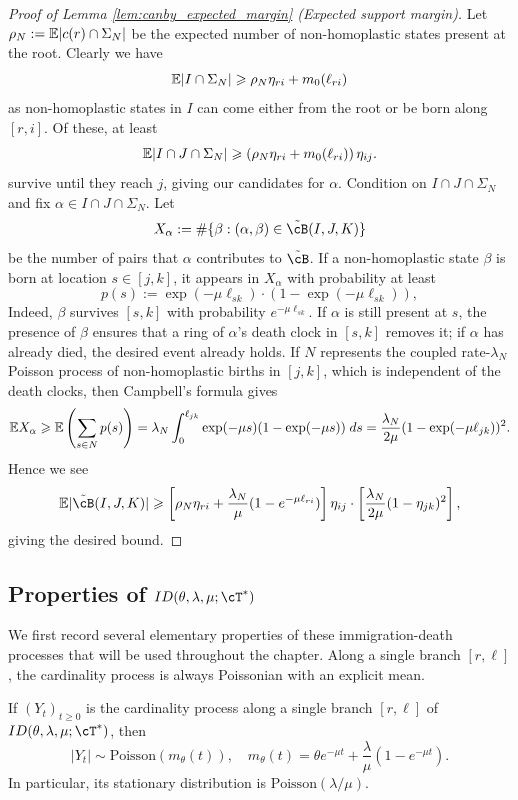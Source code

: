 \begin{proof}[Proof of Lemma \ref{lem:canby_expected_margin} (Expected support margin)]
\noindent Let $\rho_N := \mathbb{E} |c(r) \cap \Sigma_N|$ be the expected number of
non-homoplastic states present at the root. Clearly we have
%
    \[\mathbb{E} |I\cap\Sigma_N| \geqslant \rho_N \eta_{ri} + m_0(\ell_{ri})\]
%
\noindent as non-homoplastic states in $I$ can come either from the root or be born along $[r,i]$. Of these, at
least
%
    \[\mathbb{E} |I \cap J\cap\Sigma_N| \geqslant \left(\rho_N \eta_{ri} + m_0(\ell_{ri})\right) \eta_{ij}. \]
%
\noindent survive until they reach $j$, giving our candidates for $\alpha$. Condition on $I \cap J\cap\Sigma_N$ and
fix $\alpha \in I \cap J\cap\Sigma_N$. Let
%
    \[X_\alpha := \# \{\beta : (\alpha, \beta) \in \tilde{\cB}(I, J, K)\}\]
%
\noindent be the number of pairs that $\alpha$ contributes to $\tilde{\cB}$. If a non-homoplastic state
$\beta$ is born at location $s \in [j, k]$, it appears in $X_\alpha$ with probability at least
%
    \[p(s):= \exp(-\mu \ell_{sk} ) \cdot (1- \exp(-\mu \ell_{sk})),\]
%
\noindent Indeed, $\beta$ survives $[s,k]$ with probability $e^{-\mu\ell_{sk}}$.
If $\alpha$ is still present at $s$, the presence of $\beta$ ensures that a ring of $\alpha$'s
death clock in $[s,k]$ removes it; if $\alpha$ has already died, the desired event already holds.
If $N$ represents the coupled rate-$\lambda_N$ Poisson process of
non-homoplastic births in $[j,k]$, which is independent of the death clocks, then Campbell's formula gives
%
    \[\mathbb{E} X_\alpha \geqslant \mathbb{E} \left(\sum_{s \in N} p(s)\right) = \lambda_N \int_{0}^{\ell_{jk}} \exp(-\mu s) (1 - \exp(-\mu s)) \; ds = \frac{\lambda_N}{2\mu} (1-\exp(-\mu \ell_{jk}))^2. \]
%
\noindent Hence we see
%
    \[\E |\tilde{\cB}(I,J,K)| \geq \left[\rho_N \eta_{ri} + \frac{\lambda_N}{\mu}(1-e^{-\mu \ell_{ri}})\right] \eta_{ij} \cdot \left[\frac{\lambda_N}{2\mu} (1-\eta_{jk})^2\right],\]
%
\noindent giving the desired bound.
\end{proof}

\subsection{Properties of $ID(\theta, \lambda, \mu; \cT^*)$}

We first record several elementary properties of these immigration-death processes that
will be used throughout the chapter. Along a single branch $[r,\ell]$, the cardinality
process is always Poissonian with an explicit mean.

\begin{lemma}\label{lem:pop_sizes_in_ID_processes}
    If $(Y_t)_{t \geq 0}$ is the cardinality process along a single branch $[r, \ell]$ of $ID(\theta, \lambda, \mu; \cT^*)$, then
    \[|Y_t| \sim \mathrm{Poisson}(m_\theta(t)), \quad m_\theta(t) = \theta e^{-\mu t} + \frac{\lambda}{\mu}(1-e^{-\mu t}).\]
    \noindent In particular, its stationary distribution is $\mathrm{Poisson}(\lambda/\mu)$.
\end{lemma}

